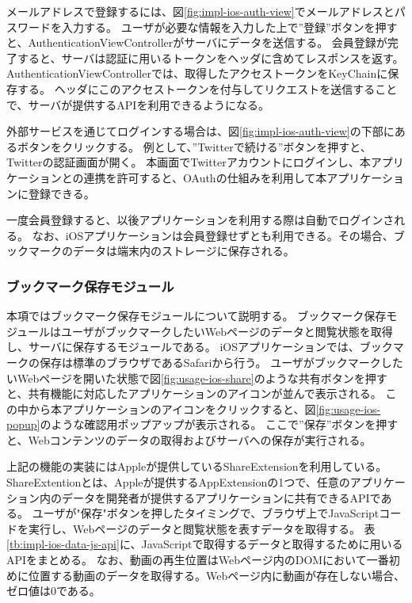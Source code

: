 メールアドレスで登録するには、図\ref{fig:impl-ios-auth-view}でメールアドレスとパスワードを入力する。
ユーザが必要な情報を入力した上で”登録”ボタンを押すと、AuthenticationViewControllerがサーバにデータを送信する。
会員登録が完了すると、サーバは認証に用いるトークンをヘッダに含めてレスポンスを返す。
AuthenticationViewControllerでは、取得したアクセストークンをKeyChain\cite{keychain}に保存する。
ヘッダにこのアクセストークンを付与してリクエストを送信することで、サーバが提供するAPIを利用できるようになる。

外部サービスを通じてログインする場合は、図\ref{fig:impl-ios-auth-view}の下部にあるボタンをクリックする。
例として、”Twitterで続ける”ボタンを押すと、Twitter\cite{twitter}の認証画面が開く。
本画面でTwitterアカウントにログインし、本アプリケーションとの連携を許可すると、OAuthの仕組みを利用して本アプリケーションに登録できる。

一度会員登録すると、以後アプリケーションを利用する際は自動でログインされる。
なお、iOSアプリケーションは会員登録せずとも利用できる。その場合、ブックマークのデータは端末内のストレージに保存される。

\subsubsection{ブックマーク保存モジュール}
本項ではブックマーク保存モジュールについて説明する。
ブックマーク保存モジュールはユーザがブックマークしたいWebページのデータと閲覧状態を取得し、サーバに保存するモジュールである。
iOSアプリケーションでは、ブックマークの保存は標準のブラウザであるSafariから行う。
ユーザがブックマークしたいWebページを開いた状態で図\ref{fig:usage-ios-share}のような共有ボタンを押すと、共有機能に対応したアプリケーションのアイコンが並んで表示される。
この中から本アプリケーションのアイコンをクリックすると、図\ref{fig:usage-ios-popup}のような確認用ポップアップが表示される。
ここで”保存”ボタンを押すと、Webコンテンツのデータの取得およびサーバへの保存が実行される。

上記の機能の実装にはAppleが提供しているShareExtension\cite{share-extension}を利用している。
ShareExtentionとは、Appleが提供するAppExtension\cite{app-extension}の1つで、任意のアプリケーション内のデータを開発者が提供するアプリケーションに共有できるAPIである。
ユーザが"保存"ボタンを押したタイミングで、ブラウザ上でJavaScriptコードを実行し、Webページのデータと閲覧状態を表すデータを取得する。
表\ref{tb:impl-ios-data-js-api}に、JavaScriptで取得するデータと取得するために用いるAPIをまとめる。
なお、動画の再生位置はWebページ内のDOMにおいて一番初めに位置する動画のデータを取得する。Webページ内に動画が存在しない場合、ゼロ値は0である。

